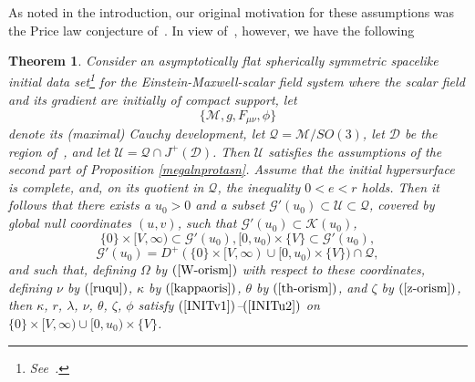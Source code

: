 \documentclass{article}
\newtheorem{theorem}{Theorem}[section]
\begin{document}
As noted in the introduction, 
our original motivation for these assumptions was the Price law
conjecture of~\cite{rpr:ns}. In view of~\cite{mi:mazi}, however,
we have the following
\begin{theorem}
\label{sxesntwv2}
Consider an asymptotically flat spherically symmetric spacelike initial data
set\footnote{See~\cite{mi:mazi}.}
for the Einstein-Maxwell-scalar field system where the scalar field
and its gradient are initially of compact support, let 
\[
\{\mathcal{M},g,F_{\mu\nu},\phi\}
\]
denote its (maximal) Cauchy development,
let $\mathcal{Q}=\mathcal{M}/SO(3)$, let 
$\mathcal{D}$ be the region of~\cite{mi:mazi},
and let $\mathcal{U}=\mathcal{Q}\cap J^+(\mathcal{D})$. 
Then $\mathcal{U}$ satisfies the assumptions of the second
part of Proposition \ref{megalnprotasn}.
Assume that the initial hypersurface is complete,
and, on its quotient in $\mathcal{Q}$, the inequality
$0<e<r$ holds. Then it 
follows that there exists a $u_0>0$ and a subset 
$\mathcal{G}'(u_0)\subset\mathcal{U}\subset\mathcal{Q}$,
covered by global null coordinates $(u,v)$, such that
$\mathcal{G}'(u_0)\subset \mathcal{K}(u_0)$,
\[
\{0\}\times[V,\infty)\subset\mathcal{G}'(u_0),
[0,u_0)\times\{V\}\subset\mathcal{G}'(u_0),
\] 
\[
\mathcal{G}'(u_0)=D^+(\{0\}\times[V,\infty)\cup[0,u_0)\times\{V\})
\cap\mathcal{Q},
\]
and such that,
defining $\Omega$ by $(\ref{W-orism})$ with respect to these coordinates,
defining $\nu$ by $(\ref{ruqu})$, $\kappa$ by $(\ref{kappaoris})$, 
$\theta$ by $(\ref{th-orism})$,
and $\zeta$ by $(\ref{z-orism})$, then $\kappa$, $r$,
$\lambda$, $\nu$, $\theta$, $\zeta$, $\phi$ satisfy 
$(\ref{INITv1})$--$(\ref{INITu2})$
on
$\{0\}\times[V,\infty)\cup[0,u_0)\times\{V\}$.
\end{theorem}
\end{document}
